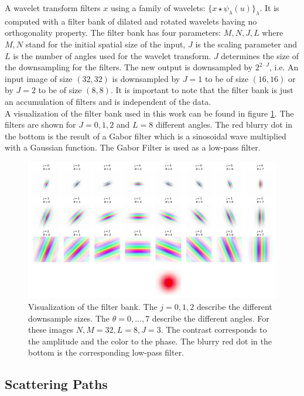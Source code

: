 A wavelet transform filters $x$ using a family of wavelets: $\{x \star \psi_\lambda (u)\}_\lambda$. It is computed with a filter bank of dilated and rotated wavelets having no orthogonality property. The filter bank has four parameters: $M, N, J, L$ where $M,N$ stand for the initial spatial size of the input, $J$ is the scaling parameter and $L$ is the number of angles used for the wavelet transform. $J$ determines the size of the downsampling for the filters. The new output is downsampled by $2^{2\cdot J}$, i.e. An input image of size $(32, 32)$ is downsampled by $J=1$ to be of size $(16,16)$ or by $J=2$ to be of size $(8,8)$. It is important to note that the filter bank is just an accumulation of filters and is independent of the data. \\
A visualization of the filter bank used in this work can be found in figure \ref{fig:viz_filter_bank}. The filters are shown for $J=0,1,2$ and $L=8$ different angles. The red blurry dot in the bottom is the result of a Gabor filter which is a sinosoidal wave multiplied with a Gaussian function. The Gabor Filter is used as a low-pass filter. 


\begin{figure}[!htb]
	\centering
	\includegraphics[width=\textwidth]{images/filter_bank_vis2.png}
	\caption{Visualization of the filter bank. The $j=0,1,2$ describe the different downsample sizes. The $\theta=0,...,7$ describe the different angles. For these images $N,M=32, L=8, J=3$. The contrast corresponds to the amplitude and the color to the phase. The blurry red dot in the bottom is the corresponding low-pass filter.}
	\label{fig:viz_filter_bank}
\end{figure}


\subsection{Scattering Paths}
\label{subsec:scattering_path}

